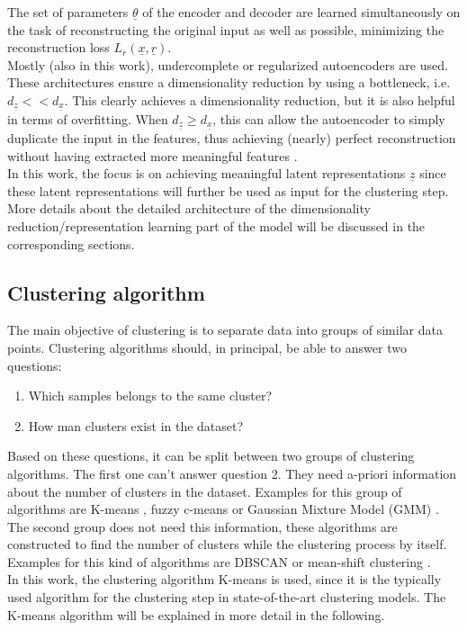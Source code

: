 \documentclass[12pt,DIV14,BCOR12mm,a4paper,footexclude,headinclude,halfparskip-,twoside,openright,cleardoubleempty,idxtotoc,bibtotoc,listtotoc,abstracton]{scrreprt} %
\numberwithin{equation}{chapter}
\begin{document}
The set of parameters $\underline{\theta}$ of the encoder and decoder are learned simultaneously on the task of reconstructing the original input as well as possible, minimizing the reconstruction loss $L_{r}(\underline{x},\underline{r})$.\\
Mostly (also in this work), undercomplete or regularized autoencoders are used. These architectures ensure a dimensionality reduction by using a bottleneck, i.e. $d_{\underline{z}} << d_{\underline{x}}$. This clearly achieves a dimensionality reduction, but it is also helpful in terms of overfitting. When $d_{\underline{z}} \geq d_{\underline{x}}$, this can allow the autoencoder to simply duplicate the input in the features, thus achieving (nearly) perfect reconstruction without having extracted more meaningful features \cite{Bengio-et-al-2013}.\\
In this work, the focus is on achieving meaningful latent representations $\underline{z}$ since these latent representations will further be used as input for the clustering step. More details about the detailed architecture of the dimensionality reduction/representation learning part of the model will be discussed in the corresponding sections.
\subsection{Clustering algorithm}
The main objective of clustering is to separate data into groups of similar data points. Clustering algorithms should, in principal, be able to answer two questions:
\begin{enumerate}
	\item Which samples belongs to the same cluster?
	\item How man clusters exist in the dataset?
\end{enumerate}
Based on these questions, it can be split between two groups of clustering algorithms. The first one can't answer question 2. They need a-priori information about the number of clusters in the dataset. Examples for this group of algorithms are K-means \cite{Lloyd82leastsquares}, fuzzy c-means \cite{Bezdek81fuzzycmenas} or Gaussian Mixture Model (GMM) \cite{Gilles07MixtureModelsforClassification}.\\
The second group does not need this information, these algorithms are constructed to find the number of clusters while the clustering process by itself. Examples for this kind of algorithms are DBSCAN \cite{Ester96adensity-based} or mean-shift clustering \cite{Fukunaga75mean-shift}.\\
In this work, the clustering algorithm K-means is used, since it is the typically used algorithm for the clustering step in state-of-the-art clustering models. The K-means algorithm will be explained in more detail in the following.
\end{document}
